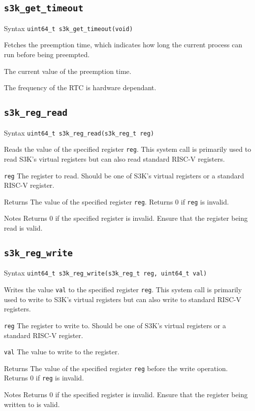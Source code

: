 \documentclass[a4paper,11pt]{article}
\newcommand{\syscall}[1]{\texttt{#1}}
\newenvironment{syscalldoc}[1]{
  \subsection{\syscall{#1}} %
  \begin{tcolorbox}
  \begin{description}[leftmargin=!,style=nextline,noitemsep]
}{
  \end{description}
  \end{tcolorbox}
}
\begin{document}
\begin{syscalldoc}{s3k\_get\_timeout}
  \item[Syntax] \lstinline{uint64_t s3k_get_timeout(void)}
  \item[Description] Fetches the preemption time, which indicates how long the current process can run before being preempted.
  \item[Returns] The current value of the preemption time.
  \item[Notes] The frequency of the RTC is hardware dependant.
\end{syscalldoc}

\begin{syscalldoc}{s3k\_reg\_read}
  \item[Syntax] \lstinline{uint64_t s3k_reg_read(s3k_reg_t reg)}
  \item[Description] Reads the value of the specified register \verb|reg|. This system call is primarily used to read S3K's virtual registers but can also read standard RISC-V registers.
  \item[Parameters]
    \begin{description}
      \item[]
      \item[\texttt{reg}] The register to read. Should be one of S3K's virtual registers or a standard RISC-V register.
    \end{description}
  \item[Returns] The value of the specified register \verb|reg|. Returns 0 if \verb|reg| is invalid.
  \item[Notes] Returns 0 if the specified register is invalid. Ensure that the register being read is valid.
\end{syscalldoc}

\begin{syscalldoc}{s3k\_reg\_write}
  \item[Syntax] \lstinline{uint64_t s3k_reg_write(s3k_reg_t reg, uint64_t val)}
  \item[Description] Writes the value \verb|val| to the specified register \verb|reg|. This system call is primarily used to write to S3K's virtual registers but can also write to standard RISC-V registers.
  \item[Parameters]
    \begin{description}
      \item[]
      \item[\texttt{reg}] The register to write to. Should be one of S3K's virtual registers or a standard RISC-V register.
      \item[\texttt{val}] The value to write to the register.
    \end{description}
  \item[Returns] The value of the specified register \verb|reg| before the write operation. Returns 0 if \verb|reg| is invalid.
  \item[Notes] Returns 0 if the specified register is invalid. Ensure that the register being written to is valid.
\end{syscalldoc}
\end{document}
